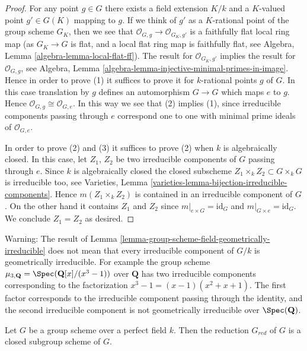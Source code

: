 \begin{proof}
For any point $g \in G$ there exists a field extension
$K/k$ and a $K$-valued point $g' \in G(K)$ mapping to
$g$. If we think of $g'$ as a $K$-rational point of the
group scheme $G_K$, then we see that
$\mathcal{O}_{G, g} \to \mathcal{O}_{G_K, g'}$ is a faithfully flat
local ring map (as $G_K \to G$ is flat, and a local flat ring map
is faithfully flat, see
Algebra, Lemma \ref{algebra-lemma-local-flat-ff}).
The result for $\mathcal{O}_{G_K, g'}$ implies the
result for $\mathcal{O}_{G, g}$, see
Algebra, Lemma \ref{algebra-lemma-injective-minimal-primes-in-image}.
Hence in order to prove (1) it suffices to
prove it for $k$-rational points $g$ of $G$. In this case
translation by $g$ defines an automorphism $G \to G$
which maps $e$ to $g$. Hence $\mathcal{O}_{G, g} \cong \mathcal{O}_{G, e}$.
In this way we see that (2) implies (1), since irreducible components
passing through $e$ correspond one to one with minimal prime ideals
of $\mathcal{O}_{G, e}$.

\medskip\noindent
In order to prove (2) and (3) it suffices to prove (2) when $k$
is algebraically closed. In this case, let $Z_1$, $Z_2$ be two
irreducible components of $G$ passing through $e$.
Since $k$ is algebraically closed the closed subscheme
$Z_1 \times_k Z_2 \subset G \times_k G$ is irreducible too, see
Varieties, Lemma \ref{varieties-lemma-bijection-irreducible-components}.
Hence $m(Z_1 \times_k Z_2)$ is contained in an irreducible
component of $G$. On the other hand it contains
$Z_1$ and $Z_2$ since $m|_{e \times G} = \text{id}_G$ and
$m|_{G \times e} = \text{id}_G$. We conclude $Z_1 = Z_2$ as desired.
\end{proof}

\begin{remark}
\label{remark-warning-group-scheme-geometrically-irreducible}
Warning: The result of
Lemma \ref{lemma-group-scheme-field-geometrically-irreducible}
does not mean that every irreducible component of $G/k$ is
geometrically irreducible. For example the group scheme
$\mu_{3, \mathbf{Q}} = \Spec(\mathbf{Q}[x]/(x^3 - 1))$
over $\mathbf{Q}$ has two irreducible components corresponding
to the factorization $x^3 - 1 = (x - 1)(x^2 + x + 1)$.
The first factor corresponds to the irreducible component
passing through the identity, and the second irreducible component
is not geometrically irreducible over $\Spec(\mathbf{Q})$.
\end{remark}

\begin{lemma}
\label{lemma-reduced-subgroup-scheme-perfect}
Let $G$ be a group scheme over a perfect field $k$.
Then the reduction $G_{red}$ of $G$ is a closed subgroup scheme of $G$.
\end{lemma}

